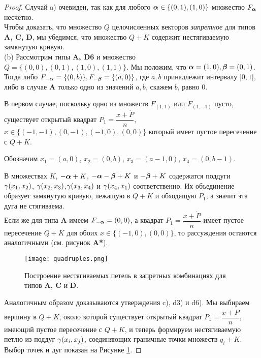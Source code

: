 \begin{proof} 

Случай a) очевиден, так как для любого ${\bm{\alpha}}\in\{(0,1),(1,0)\}$ множество $F_{\bm{\alpha}}$ несчётно.\\

Чтобы доказать, что множество $Q$ целочисленных векторов {\em запретное} для типов {\bf A, C, D}, мы убедимся, что множество $Q+K$ содержит нестягиваемую замкнутую  кривую.\\

(b)  Рассмотрим типы {\bf A, D6} и множество $Q=\{(0,0), (0,1), (1,0), (1,1)\}$. Мы положим, что ${\bm{\alpha}}=(1,0), {\bm{\beta}}=(0,1)$. Тогда   либо $F_{-{\bm{\alpha}}}=\{(0,b)\}, F_{-{\bm{\beta}}}=\{(a,0)\}$, где $a,b$ принадлежит интервалу $]0,1[$,  либо в случае {\bf A} только одно из значений $a,b$, скажем $b$, равно 0.

В первом случае, поскольку одно из множеств $F_{(1,1)}$ или $F_{(1,-1)}$ пусто, существует открытый квадрат $P_1=\dfrac{x+\dot P}{n}$, $x\in \{(-1,-1),(0,-1), (-1,0), (0,0)\}$ который имеет пустое пересечение  с $Q+K$. 

Обозначим $x_1=(a,0)$, 
$x_2=(0,b)$, $x_3=(a-1,0)$, $x_4=(0,b-1)$. 

 В множествах  $K$, $-{\bm{\alpha}}+K$, $-{\bm{\alpha}}-{\bm{\beta}}+K$ и $-{\bm{\beta}}+K$ содержатся поддуги  $\gamma(x_1,x_2)$, $\gamma(x_2,x_3)$,$\gamma(x_3,x_4)$ и $\gamma(x_4,x_1)$ соответственно. Их объединение
 образует замкнутую кривую, лежащую в $Q+K$ и обходящую $P_1$, а значит эта дуга не стягиваема.\\ 

Если же для типа {\bf A} имеем $F_{-{\bm{\alpha}}}=(0,0)$, а квадрат $P_1=\dfrac{x+\dot P}{n}$ имеет пустое пересечение $Q+K$ для обоих $x\in\{(-1,0), (0,0)\}$, то рассуждения остаются аналогичными (см. рисунок {\bf A*}).\\

\begin{figure}[h] 
    \centering
    \texttt{[image: quadruples.png]}
    \caption{Построение нестягиваемых петель в запретных комбинациях для типов {\bf A, C} и {\bf D}.}
    \label{forbid}
\end{figure}

Аналогичным образом доказываются утверждения c), d3) и d6).
Мы выбираем вершину в $Q+K$, около которой существует открытый квадрат $P_1=\dfrac{x+\dot P}{n}$, имеющий пустое пересечение с $Q+K$, и теперь формируем нестягиваемую петлю из поддуг $\gamma(x_i,x_j)$, соединяющих граничные точки множеств $q_i+K$.
Выбор точек и дуг показан на Рисунке \ref{forbid}.
\end{proof}


